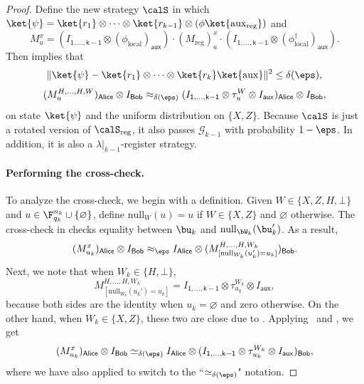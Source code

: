 \documentclass[11pt]{article}
\newcommand{\consistency}{\simeq}
\newcommand{\hideq}{H}
\newcommand{\noop}{\bot}
\newcommand{\shorten}[2]{#1|_{#2}}
\newcommand{\register}{\lambda}
\newcommand{\game}{\mathscr{G}}
\newcommand{\reg}[1]{{\mathsf{#1}}}
\begin{document}
\begin{proof}
Define the new strategy $\calS$ in which $\ket{\psi} = \ket{r_1} \otimes \cdots \otimes \ket{r_{k-1}} \otimes (\phi \ket{\mathrm{aux}_{\mathrm{reg}}})$
and 
\begin{equation*}
M^x_a = (I_{\reg{1, \ldots, k-1}} \otimes (\phi_{\mathrm{local}})_{\reg{aux}})
	\cdot (M_{\mathrm{reg}})^x_a
		\cdot (I_{\reg{1, \ldots, k-1}} \otimes (\phi^\dagger_{\mathrm{local}})_{\reg{aux}}).
\end{equation*}
Then  implies that
\begin{equation}\label{eq:applied-the-fact-again}
\Vert  \ket{\psi} - \ket{r_1}\otimes \cdots \otimes \ket{r_k} \ket{\mathrm{aux}} \Vert^2 \leq \delta(\eps),
\end{equation}
\begin{equation}\label{eq:applied-the-fact-again-dos}
(M^{H, \ldots, H, W}_u)_{\reg{Alice}} \otimes I_{\reg{Bob}}
\approx_{\delta(\eps)}
(I_{\reg{1, \ldots, k-1}} \otimes \tau_{u}^{W} \otimes I_{\reg{aux}})_{\reg{Alice}} \otimes I_{\reg{Bob}},
\end{equation}
on state $\ket{\psi}$ and the uniform distribution on $\{X,Z\}$.
Because $\calS$ is just a rotated version of $\calS_{\mathrm{reg}}$,
it also passes  $\game_{k-1}$ with probability $1-\eps$.
In addition, it is also a $\shorten{\register}{k-1}$-register strategy.

\paragraph{Performing the cross-check.}
To analyze the cross-check, we begin with a definition.
Given $W \in \{X, Z, \hideq, \noop\}$
and $u \in \F_{q_k}^{n_k} \cup \{\varnothing\}$, define
$\mathrm{null}_{W}(u) = u$ if $W \in \{X, Z\}$ and $\varnothing$ otherwise.
The cross-check in  checks equality between
$\bu_k$ and $\mathrm{null}_{\bW_k}(\bu_k')$.
As a result,
\begin{equation*}
(M^x_{u_k})_{\reg{Alice}} \otimes I_{\reg{Bob}}
\approx_{\eps} I_{\reg{Alice}} \otimes (M^{\hideq, \ldots, \hideq, W_k}_{[\mathrm{null}_{W_k}(u_k') = u_k]})_{\reg{Bob}}.
\end{equation*}
Next, we note that when $W_k \in \{\hideq, \noop\}$,
\begin{equation*}
M^{\hideq, \ldots, \hideq, W_k}_{[\mathrm{null}_{W_k}(u_k') = u_k]}
= I_{\reg{1, \ldots, k-1}} \otimes \tau^{W_k}_{u_k} \otimes I_{\reg{aux}},
\end{equation*}
because both sides are the identity when $u_k = \varnothing$ and zero otherwise.
On the other hand, when $W_k \in \{X, Z\}$, these two are close due to .
Applying~ and , we get
\begin{equation}\label{eq:looks-like-tau}
(M^x_{u_k})_{\reg{Alice}} \otimes I _{\reg{Bob}}
\consistency_{\delta(\eps)} I_{\reg{Alice}} \otimes (I_{\reg{1, \ldots, k-1}} \otimes \tau^{W_k}_{u_k} \otimes I_{\reg{aux}})_{\reg{Bob}},
\end{equation}
where we have also applied  to switch to the ``$\consistency_{\delta(\eps)}$" notation.


\end{proof}
\end{document}
